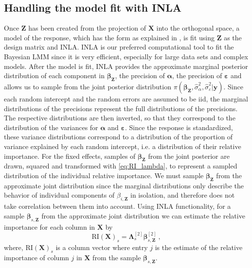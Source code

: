 \subsection{Handling the model fit with INLA}
\label{sec:BVI_handling}
Once $\mathbf{Z}$ has been created from the projection of $\mathbf{X}$ into the orthogonal space, a model of the response, which has the form as explained in , is fit using $\mathbf{Z}$ as the design matrix and INLA. 
INLA is our preferred computational tool to fit the Bayesian LMM since it is very efficient, especially for large data sets and complex models.
After the model is fit, INLA provides the approximate marginal posterior distribution of each component in $\boldsymbol{\beta}_{\mathbf{Z}}$, the precision of $\boldsymbol{\alpha}$, the precision of $\boldsymbol{\varepsilon}$ and allows us to sample from the joint posterior distribution $\pi(\boldsymbol{\beta}_{\mathbf{Z}}, \hat{\sigma}^2_{\alpha}, \hat{\sigma}^2_{\varepsilon} \lvert \mathbf{y})$. 
Since each random intercept and the random errors are assumed to be iid, the marginal distributions of the precisions represent the full distributions of the precisions. 
The respective distributions are then inverted, so that they correspond to the distribution of the variances for $\boldsymbol{\alpha}$ and $\boldsymbol{\varepsilon}$. 
Since the response is standardized, these variance distributions correspond to a distribution of the proportion of variance explained by each random intercept, i.e. a distribution of their relative importance.
For the fixed effects, samples of $\boldsymbol{\beta}_{\mathbf{Z}}$ from the joint posterior are drawn, squared and transformed with \eqref{eq:RI_lambda}, to represent a sampled distribution of the individual relative importance. 
We must sample $\boldsymbol{\beta}_{\mathbf{Z}}$ from the approximate joint distribution since the marginal distributions only describe the behavior of individual components of $\beta_{i, \mathbf{Z}}$ in isolation, and therefore does not take correlation between them into account.
Using INLA functionality, for a sample $\boldsymbol{\beta}_{s, \mathbf{Z}}$ from the approximate joint distribution we can estimate the relative importance for each column in $\mathbf{X}$ by
\begin{equation}
    \text{RI}(\mathbf{X})_s = \boldsymbol{\Lambda}_{s}^{[2]} \boldsymbol{\beta}_{s, \mathbf{Z}}^{[2]} \ ,
\end{equation}
where, $\text{RI}(\mathbf{X})_s$ is a column vector where entry $j$ is the estimate of the relative importance of column $j$ in $\mathbf{X}$ from the sample $\boldsymbol{\beta}_{s, \mathbf{Z}}$.
